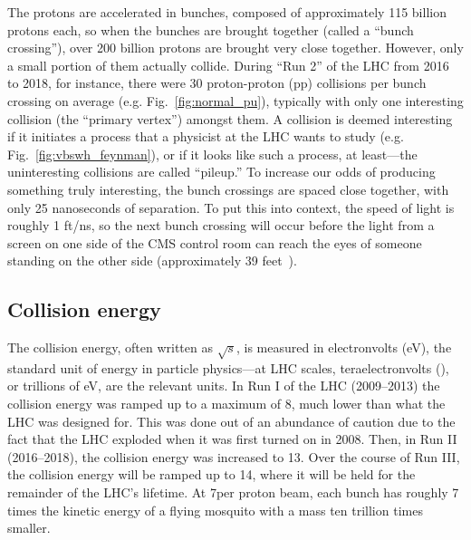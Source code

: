 The protons are accelerated in bunches, composed of approximately 115 billion protons each, so when the bunches are brought together (called a ``bunch crossing''), over 200 billion protons are brought very close together.
However, only a small portion of them actually collide. 
During ``Run 2'' of the LHC from 2016 to 2018, for instance, there were 30 proton-proton (pp) collisions per bunch crossing on average (e.g. Fig.~\ref{fig:normal_pu}), typically with only one interesting collision (the ``primary vertex'') amongst them. 
A collision is deemed interesting if it initiates a process that a physicist at the LHC wants to study (e.g. Fig.~\ref{fig:vbswh_feynman}), or if it looks like such a process, at least---the uninteresting collisions are called ``pileup.'' 
To increase our odds of producing something truly interesting, the bunch crossings are spaced close together, with only 25 nanoseconds of separation. 
To put this into context, the speed of light is roughly 1 ft/ns, so the next bunch crossing will occur before the light from a screen on one side of the CMS control room can reach the eyes of someone standing on the other side (approximately 39 feet~\cite{CMSP5Layout}).

\subsection{Collision energy}
The collision energy, often written as $\sqrt{s}$, is measured in electronvolts (eV), the standard unit of energy in particle physics---at LHC scales, teraelectronvolts (\TeVns), or trillions of eV, are the relevant units. %
In Run I of the LHC (2009--2013) the collision energy was ramped up to a maximum of 8\TeV, much lower than what the LHC was designed for. %
This was done out of an abundance of caution due to the fact that the LHC exploded when it was first turned on in 2008. %
Then, in Run II (2016--2018), the collision energy was increased to 13\TeV. 
Over the course of Run III, the collision energy will be ramped up to 14\TeV, where it will be held for the remainder of the LHC's lifetime. 
At 7\TeV per proton beam, each bunch has roughly 7 times the kinetic energy of a flying mosquito with a mass ten trillion times smaller. 

